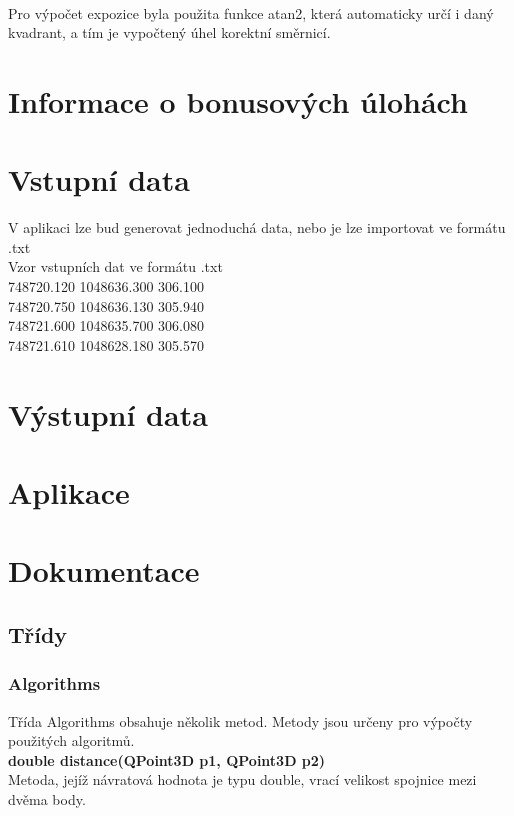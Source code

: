 \documentclass[a4paper, 12pt]{article}
\begin{document}
\

Pro výpočet expozice byla použita funkce atan2, která automaticky určí i daný kvadrant, a tím je vypočtený úhel korektní směrnicí.

\section{Informace o bonusových úlohách}


\section{Vstupní data}
V aplikaci lze bud generovat jednoduchá data, nebo je lze importovat ve formátu .txt\\

Vzor vstupních dat ve formátu .txt\\
 748720.120    1048636.300     306.100\\
 748720.750    1048636.130     305.940\\
 748721.600    1048635.700     306.080\\
 748721.610    1048628.180     305.570\\

\section{Výstupní data}

\section{Aplikace}


\section{Dokumentace}
\subsection{Třídy}
\subsubsection{Algorithms}
Třída Algorithms obsahuje několik metod. Metody jsou určeny pro výpočty použitých algoritmů.
\\

\textbf{double distance(QPoint3D p1, QPoint3D p2)}\\
Metoda, jejíž návratová hodnota je typu double, vrací velikost spojnice mezi dvěma body.
\\
\end{document}
